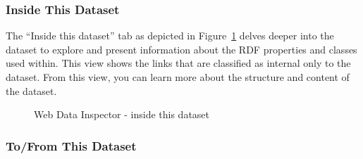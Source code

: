 \subsubsection{Inside This Dataset}

The ``Inside this dataset'' tab as depicted in Figure~\ref{fig:wdi:insideThisDataset} delves deeper into the dataset to explore and present information about the RDF properties and classes used within. This view shows the links that are classified as internal only to the dataset. From this view, you can learn more about the structure and content of the dataset.

\begin{figure}
	\centering
	\caption{Web Data Inspector - inside this dataset}
	\label{fig:wdi:insideThisDataset}
\end{figure}


\subsubsection{To/From This Dataset}

